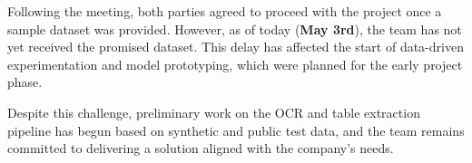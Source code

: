 Following the meeting, both parties agreed to proceed with the project once a sample dataset was provided. However, as of today (\textbf{May 3rd}), the team has not yet received the promised dataset. This delay has affected the start of data-driven experimentation and model prototyping, which were planned for the early project phase.

Despite this challenge, preliminary work on the OCR and table extraction pipeline has begun based on synthetic and public test data, and the team remains committed to delivering a solution aligned with the company’s needs.

